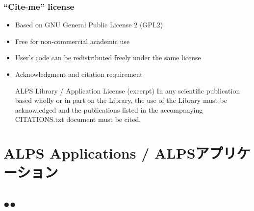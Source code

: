 \begin{frame}[t,fragile]
\frametitle{``Cite-me'' license}
  \begin{itemize}
  \item Based on GNU General Public License 2 (GPL2)
  \item Free for non-commercial academic use
  \item User's code can be redistributed freely under the same license
  \item Acknowledgment and citation requirement
    \begin{minipage}{.9\textwidth}
    \begin{block}{ALPS Library / Application License (excerpt)}
      In any scientific publication based wholly or in part on the
      Library, the use of the Library must be acknowledged and the
      publications listed in the accompanying CITATIONS.txt document
      must be cited.
    \end{block}
    \end{minipage}
  \end{itemize}
\end{frame}

\section{ALPS Applications / ALPSアプリケーション}
\subsection*{{\protect\color{red}●}{\protect\color{blue}●}}

